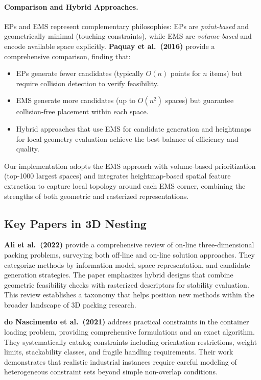 \paragraph{Comparison and Hybrid Approaches.}
EPs and EMS represent complementary philosophies: EPs are \textit{point-based} and geometrically minimal (touching constraints), while EMS are \textit{volume-based} and encode available space explicitly. \textbf{Paquay et al.\ (2016) \cite{PSD+16}} provide a comprehensive comparison, finding that:
\begin{itemize}
\item EPs generate fewer candidates (typically $O(n)$ points for $n$ items) but require collision detection to verify feasibility.
\item EMS generate more candidates (up to $O(n^2)$ spaces) but guarantee collision-free placement within each space.
\item Hybrid approaches that use EMS for candidate generation and heightmaps for local geometry evaluation achieve the best balance of efficiency and quality.
\end{itemize}

Our implementation adopts the EMS approach with volume-based prioritization (top-1000 largest spaces) and integrates heightmap-based spatial feature extraction to capture local topology around each EMS corner, combining the strengths of both geometric and rasterized representations.

\subsection{Key Papers in 3D Nesting}

\textbf{Ali et al.\ (2022) \cite{ARCO22}} provide a comprehensive review of on-line three-dimensional packing problems, surveying both off-line and on-line solution approaches. They categorize methods by information model, space representation, and candidate generation strategies. The paper emphasizes hybrid designs that combine geometric feasibility checks with rasterized descriptors for stability evaluation. This review establishes a taxonomy that helps position new methods within the broader landscape of 3D packing research.

\textbf{do Nascimento et al.\ (2021) \cite{dNAJ21}} address practical constraints in the container loading problem, providing comprehensive formulations and an exact algorithm. They systematically catalog constraints including orientation restrictions, weight limits, stackability classes, and fragile handling requirements. Their work demonstrates that realistic industrial instances require careful modeling of heterogeneous constraint sets beyond simple non-overlap conditions.

